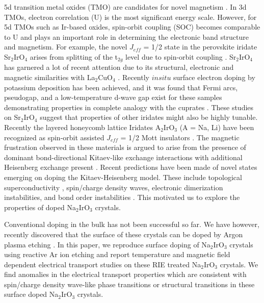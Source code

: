 \documentclass[aps,prb,twocolumn]{revtex4-1}
\begin{document}
5d transition metal oxides (TMO) are candidates for novel magnetism \cite{Jackeli2009, Crawford1994}. In 3d TMOs, electron correlation (U) is the most significant energy scale. However, for 5d TMOs such as Ir-based oxides, spin-orbit coupling (SOC) becomes comparable to U and plays an important role in determining the electronic band structure and magnetism.  For example, the novel $J_{eff} $ = 1/2 state in the perovskite iridate Sr$_{2}$IrO$ _{4} $ arises from splitting of the t$ _{2g}$ level due to spin-orbit coupling \cite{Kim2009, Kim2008}. Sr$_{2}$IrO$ _{4}$ has garnered a lot of recent attention due to its structural, electronic and magnetic similarities with La$_{2}$CuO$ _{4} $  \cite{Crawford1994, Kim2008}. Recently $in situ$ surface electron doping by potassium deposition has been achieved, and it was found that Fermi arcs, pseudogap, and a low-temperature d-wave gap exist for these samples demonstrating properties in complete analogy with the cuprates \cite{Kim2014, Kim2016, Yan2015}. These studies on Sr$_2$IrO$_4$ suggest that properties of other iridates might also be highly tunable. Recently the layered honeycomb lattice Iridates A$_{2}$IrO$ _{3} $ (A = Na, Li) have been recognized as spin-orbit assisted $J_{eff} $ = 1/2 Mott insulators \cite{ Jackeli2009, Singh2010, Choi2012, Singh2012}. The magnetic frustration observed in these materials is argued to arise from the presence of dominant bond-directional Kitaev-like exchange interactions with additional Heisenberg exchange present \cite{Chun2015,Singh2012}.  Recent predictions have been made of novel states emerging on doping the Kitaev-Heisenberg model. These include topological superconductivity \cite{You2012, Okamoto2013}, spin/charge density waves, electronic dimerization instabilities, and bond order instabilities \cite{Scherer2014}. This motivated us to explore the properties of doped Na$_2$IrO$_3$ crystals.  

Conventional doping in the bulk has not been successful so far. We have however, recently discovered that the surface of these crystals can be doped by Argon plasma etching \cite{Mehlawat2016}. In this paper, we reproduce surface doping of Na$_2$IrO$_3$ crystals using reactive Ar ion etching and report temperature and magnetic field dependent electrical transport studies on these RIE treated Na$_2$IrO$_3$ crystals.  We find anomalies in the electrical transport properties which are consistent with spin/charge density wave-like phase transitions or structural transitions in these surface doped Na$_{2}$IrO$_{3}$ crystals.  
\end{document}
